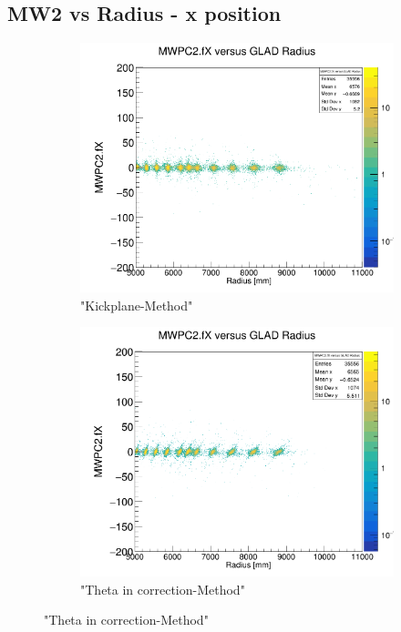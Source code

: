 \documentclass[12pt, letterpaper]{article}
\begin{document}
\subsection{MW2 vs Radius - x position}
\begin{figure}[!htbp]
\begin{subfigure}{.5\textwidth}
  \centering
  \includegraphics[width=.9\linewidth]{plot_imgs/mw2_rho_get_centr.png}  
  \caption{"Kickplane-Method"}
  \label{fig:sub-first}
\end{subfigure}
\begin{subfigure}{.5\textwidth}
  \centering
  \includegraphics[width=.9\linewidth]{plot_imgs/mw2_rho_corr.png} 
  \caption{"Theta \textunderscore in correction-Method"}
  \label{fig:sub-second}

\end{subfigure}
\end{figure}
\end{document}
